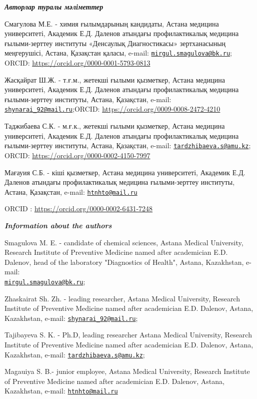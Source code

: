 \begin{authorinfo}
\emph{{\bfseries Авторлар туралы мәліметтер}}

Смагулова М.Е. - химия ғылымдарының кандидаты, Астана медицина
университеті, Академик Е.Д. Даленов атындағы профилактикалық медицина
ғылыми-зерттеу институты «Денсаулық Диагностикасы» зертханасының
меңгерушісі, Астана, Қазақстан қаласы, e-mail:
\href{mailto:mirgul.smagulova@bk.ru}{\nolinkurl{mirgul.smagulova@bk.ru}};
ORCID: \url{https://orcid.org/0000-0001-5793-0813}

Жасқайрат Ш.Ж. - т.ғ.м., жетекші ғылыми қызметкер, Астана медицина
университеті, Академик Е.Д. Даленов атындағы профилактикалық медицина
ғылыми-зерттеу институты, Астана, Қазақстан, e-mail:
\href{mailto:shynarai\_92@mail.ru}{\nolinkurl{shynarai\_92@mail.ru}};ORCID:
\url{https://orcid.org/0009-0008-2472-4210}

Таджибаева С.К. - м.ғ.к., жетекші ғылыми қызметкер, Астана медицина
университеті, Академик Е.Д. Даленов атындағы профилактикалық медицина
ғылыми-зерттеу институты, Астана, Қазақстан, e-mail:
\href{mailto:tardzhibaeva.s@amu.kz}{\nolinkurl{tardzhibaeva.s@amu.kz}};
ORCID: \url{https://orcid.org/0000-0002-4150-7997}

Мағауия С.Б. - кіші қызметкер, Астана медицина университеті, Академик
Е.Д. Даленов атындағы профилактикалық медицина ғылыми-зерттеу институты,
Астана, Қазақстан, e-mail:
\href{mailto:htnhto@mail.ru}{\nolinkurl{htnhto@mail.ru}}

ORCID : \url{https://orcid.org/0000-0002-6431-7248}

\emph{{\bfseries Information about the authors}}

Smagulova M. E. - candidate of chemical sciences, Astana Medical
University, Research Institute of Preventive Medicine named after
academician E.D. Dalenov, head of the laboratory "Diagnostics of
Health", Astana, Kazakhstan, e-mail:\\
\href{mailto:mirgul.smagulova@bk.ru}{\nolinkurl{mirgul.smagulova@bk.ru}};

Zhaskairat Sh. Zh. - leading researcher, Astana Medical University,
Research Institute of Preventive Medicine named after academician E.D.
Dalenov, Astana, Kazakhstan, e-mail:
\href{mailto:shynarai\_92@mail.ru}{\nolinkurl{shynarai\_92@mail.ru}};

Tajibayeva S. K. - Ph.D, leading researcher Astana Medical University,
Research Institute of Preventive Medicine named after academician E.D.
Dalenov, Astana, Kazakhstan, e-mail:
\href{mailto:tardzhibaeva.s@amu.kz}{\nolinkurl{tardzhibaeva.s@amu.kz}};

Magauiya S. B.- junior employee, Astana Medical University, Research
Institute of Preventive Medicine named after academician E.D. Dalenov,
Astana, Kazakhstan, e-mail:
\href{mailto:htnhto@mail.ru}{\nolinkurl{htnhto@mail.ru}}\
\end{authorinfo}
